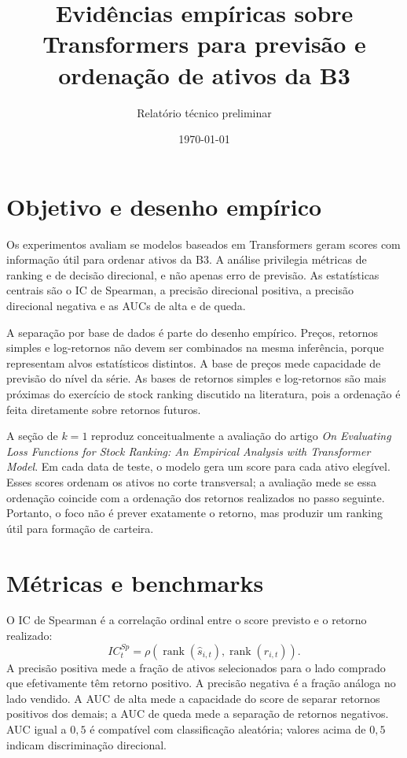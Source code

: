 \documentclass[12pt,a4paper]{article}
\title{Evidências empíricas sobre Transformers para previsão e ordenação de ativos da B3}
\author{Relatório técnico preliminar}
\date{\today}
\begin{document}
\maketitle

\section{Objetivo e desenho empírico}

Os experimentos avaliam se modelos baseados em Transformers geram scores com informação útil para ordenar ativos da B3. A análise privilegia métricas de ranking e de decisão direcional, e não apenas erro de previsão. As estatísticas centrais são o IC de Spearman, a precisão direcional positiva, a precisão direcional negativa e as AUCs de alta e de queda.

A separação por base de dados é parte do desenho empírico. Preços, retornos simples e log-retornos não devem ser combinados na mesma inferência, porque representam alvos estatísticos distintos. A base de preços mede capacidade de previsão do nível da série. As bases de retornos simples e log-retornos são mais próximas do exercício de stock ranking discutido na literatura, pois a ordenação é feita diretamente sobre retornos futuros.

A seção de $k=1$ reproduz conceitualmente a avaliação do artigo \textit{On Evaluating Loss Functions for Stock Ranking: An Empirical Analysis with Transformer Model}. Em cada data de teste, o modelo gera um score para cada ativo elegível. Esses scores ordenam os ativos no corte transversal; a avaliação mede se essa ordenação coincide com a ordenação dos retornos realizados no passo seguinte. Portanto, o foco não é prever exatamente o retorno, mas produzir um ranking útil para formação de carteira.

\section{Métricas e benchmarks}

O IC de Spearman é a correlação ordinal entre o score previsto e o retorno realizado:
\[
IC_t^{Sp}=\rho\left(\operatorname{rank}(\hat{s}_{i,t}),\operatorname{rank}(r_{i,t})\right).
\]
A precisão positiva mede a fração de ativos selecionados para o lado comprado que efetivamente têm retorno positivo. A precisão negativa é a fração análoga no lado vendido. A AUC de alta mede a capacidade do score de separar retornos positivos dos demais; a AUC de queda mede a separação de retornos negativos. AUC igual a $0{,}5$ é compatível com classificação aleatória; valores acima de $0{,}5$ indicam discriminação direcional.
\end{document}
